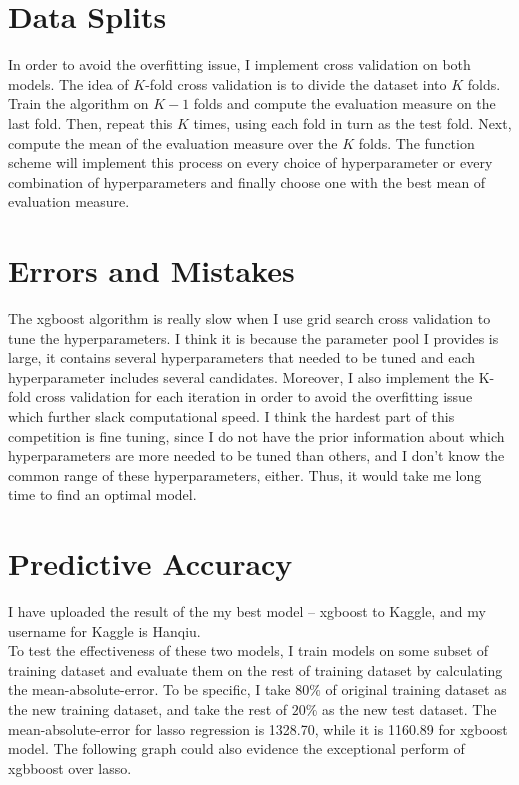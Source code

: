 \documentclass[12pt]{article}
\begin{document}
\section{Data Splits}

In order to avoid the overfitting issue, I implement cross validation on both models. The idea of $K$-fold cross validation is to divide the dataset into $K$ folds. Train the algorithm on $K-1$ folds and compute the evaluation measure on the last fold. Then, repeat this $K$ times, using each fold in turn as the test fold. Next, compute the mean of the evaluation measure over the $K$ folds. The function scheme will implement this process on every choice of hyperparameter or every combination of hyperparameters and finally choose one with the best mean of evaluation measure. 



\section{Errors and Mistakes}

The xgboost algorithm is really slow when I use grid search cross validation to tune the hyperparameters.  I think it is because the parameter pool I provides is large, it contains several hyperparameters that needed to be tuned and  each hyperparameter includes several candidates. Moreover, I also implement the K-fold cross validation for each iteration in order to avoid the overfitting issue which further slack computational speed.  I think the hardest part of this competition is fine tuning, since I do not have the prior information about which hyperparameters are more needed to be tuned than others, and I don't know the common range of these hyperparameters, either. Thus, it would take  me  long time to find an optimal model.



\section{Predictive Accuracy}
I have uploaded the result of the my best model -- xgboost  to Kaggle, and my username for Kaggle is Hanqiu.\\

To test the effectiveness of these two models, I train models on some subset of training dataset and evaluate them on the rest of training dataset by calculating the mean-absolute-error. To be specific, I take $80\%$ of original training dataset as the new training dataset, and take the rest of $20\%$  as the new test dataset. The mean-absolute-error for lasso regression is 1328.70, while it is 1160.89 for xgboost model.  The following graph could also evidence the exceptional perform of xgbboost over lasso. 
\end{document}
